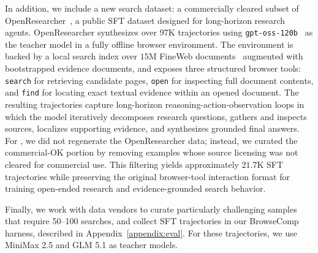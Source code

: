 In addition, we include a new search dataset: a commercially cleared subset of OpenResearcher~\citep{li2026openresearcher}, a public SFT dataset designed for long-horizon research agents. OpenResearcher synthesizes over $97$K trajectories using \texttt{gpt-oss-120b}~\citep{agarwal2025gpt} as the teacher model in a fully offline browser environment. The environment is backed by a local search index over $15$M FineWeb documents~\citep{penedo2024fineweb} augmented with bootstrapped evidence documents, and exposes three structured browser tools: \texttt{search} for retrieving candidate pages, \texttt{open} for inspecting full document contents, and \texttt{find} for locating exact textual evidence within an opened document. The resulting trajectories capture long-horizon reasoning-action-observation loops in which the model iteratively decomposes research questions, gathers and inspects sources, localizes supporting evidence, and synthesizes grounded final answers. For \ourmodel, we did not regenerate the OpenResearcher data; instead, we curated the commercial-OK portion by removing examples whose source licensing was not cleared for commercial use. This filtering yields approximately $21.7$K SFT trajectories while preserving the original browser-tool interaction format for training open-ended research and evidence-grounded search behavior.

Finally, we work with data vendors to curate particularly challenging samples that require 50--100 searches, and collect SFT trajectories in our BrowseComp harness, described in Appendix~\ref{appendix:eval}. For these trajectories, we use MiniMax 2.5 and GLM 5.1 as teacher models.


